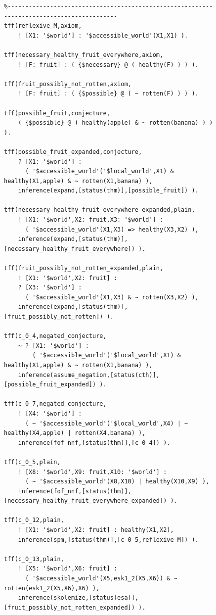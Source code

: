 \documentclass{ceurart}
\begin{document}
\begin{figure}[h!]
\centering
{\footnotesize
{\setlength{\baselineskip}{3mm}
\begin{verbatim}
%------------------------------------------------------------------------------------------
tff(reflexive_M,axiom,
    ! [X1: '$world'] : '$accessible_world'(X1,X1) ).

tff(necessary_healthy_fruit_everywhere,axiom,
    ! [F: fruit] : ( {$necessary} @ ( healthy(F) ) ) ).

tff(fruit_possibly_not_rotten,axiom,
    ! [F: fruit] : ( {$possible} @ ( ~ rotten(F) ) ) ).

tff(possible_fruit,conjecture,
    ( {$possible} @ ( healthy(apple) & ~ rotten(banana) ) ) ).

tff(possible_fruit_expanded,conjecture,
    ? [X1: '$world'] :
      ( '$accessible_world'('$local_world',X1) & healthy(X1,apple) & ~ rotten(X1,banana) ),
    inference(expand,[status(thm)],[possible_fruit]) ).

tff(necessary_healthy_fruit_everywhere_expanded,plain,
    ! [X1: '$world',X2: fruit,X3: '$world'] :
      ( '$accessible_world'(X1,X3) => healthy(X3,X2) ),
    inference(expand,[status(thm)],[necessary_healthy_fruit_everywhere]) ).

tff(fruit_possibly_not_rotten_expanded,plain,
    ! [X1: '$world',X2: fruit] :
    ? [X3: '$world'] :
      ( '$accessible_world'(X1,X3) & ~ rotten(X3,X2) ),
    inference(expand,[status(thm)],[fruit_possibly_not_rotten]) ).

tff(c_0_4,negated_conjecture,
    ~ ? [X1: '$world'] :
        ( '$accessible_world'('$local_world',X1) & healthy(X1,apple) & ~ rotten(X1,banana) ),
    inference(assume_negation,[status(cth)],[possible_fruit_expanded]) ).

tff(c_0_7,negated_conjecture,
    ! [X4: '$world'] :
      ( ~ '$accessible_world'('$local_world',X4) | ~ healthy(X4,apple) | rotten(X4,banana) ),
    inference(fof_nnf,[status(thm)],[c_0_4]) ).

tff(c_0_5,plain,
    ! [X8: '$world',X9: fruit,X10: '$world'] :
      ( ~ '$accessible_world'(X8,X10) | healthy(X10,X9) ),
    inference(fof_nnf,[status(thm)],[necessary_healthy_fruit_everywhere_expanded]) ).

tff(c_0_12,plain,
    ! [X1: '$world',X2: fruit] : healthy(X1,X2),
    inference(spm,[status(thm)],[c_0_5,reflexive_M]) ).

tff(c_0_13,plain,
    ! [X5: '$world',X6: fruit] :
      ( '$accessible_world'(X5,esk1_2(X5,X6)) & ~ rotten(esk1_2(X5,X6),X6) ),
    inference(skolemize,[status(esa)],[fruit_possibly_not_rotten_expanded]) ).


\end{verbatim}}}
\end{figure}
\end{document}
